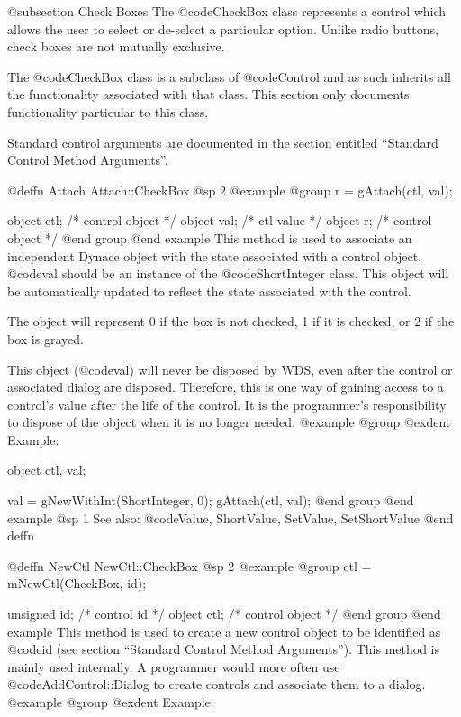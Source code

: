 @subsection Check Boxes
The @code{CheckBox} class represents a control which allows the user
to select or de-select a particular option.  Unlike radio buttons,
check boxes are not mutually exclusive.

The @code{CheckBox} class is a subclass of @code{Control} and as such
inherits all the functionality associated with that class.  This section
only documents functionality particular to this class.

Standard control arguments are documented in the section entitled
``Standard Control Method Arguments''.








@deffn {Attach} Attach::CheckBox
@sp 2
@example
@group
r = gAttach(ctl, val);

object  ctl;   /*  control object  */
object  val;   /*  ctl value       */
object  r;     /*  control object  */
@end group
@end example
This method is used to associate an independent Dynace object with the
state associated with a control object.  @code{val} should be an
instance of the @code{ShortInteger} class.  This object will be
automatically updated to reflect the state associated with the control.

The object will represent 0 if the box is not checked, 1 if it is
checked, or 2 if the box is grayed.

This object (@code{val}) will never be disposed by WDS, even after
the control or associated dialog are disposed.  Therefore, this
is one way of gaining access to a control's value after the life
of the control.  It is the programmer's responsibility to dispose of
the object when it is no longer needed.
@example
@group
@exdent Example:

object  ctl, val;

val = gNewWithInt(ShortInteger, 0);
gAttach(ctl, val);
@end group
@end example
@sp 1
See also:  @code{Value, ShortValue, SetValue, SetShortValue}
@end deffn












@deffn {NewCtl} NewCtl::CheckBox
@sp 2
@example
@group
ctl = mNewCtl(CheckBox, id);

unsigned  id;   /*  control id      */
object   ctl;   /*  control object  */
@end group
@end example
This method is used to create a new control object to be identified as
@code{id} (see section ``Standard Control Method Arguments'').  This
method is mainly used internally.  A programmer would more often
use @code{AddControl::Dialog} to create controls and associate them
to a dialog.
@example
@group
@exdent Example:

